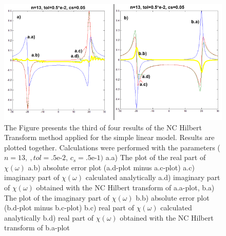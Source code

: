 \documentclass[12pt,twoside,a4paper]{article}
\numberwithin{equation}{subsection}
\numberwithin{figure}{subsection}
\begin{document}
\begin{figure}
  \includegraphics[width=150mm]{img/nc_lin3.png}
  \caption{ The Figure presents the third of four results of the NC Hilbert Transform method applied for the simple linear model. Results are plotted together. Calculations were performed with the parameters ($n = 13, \ , tol = \mbox{.5e-2}, \, c_s = \mbox{.5e-1})$
    a.a) The plot of the real part of $\chi (\omega )$
    a.b) absolute error plot (a.d-plot minus a.c-plot) 
    a.c) imaginary part of $\chi (\omega )$ calculated analytically 
    a.d) imaginary part of $\chi (\omega )$ obtained with the NC Hilbert transform of a.a-plot, 
    b.a) The plot of the imaginary part of $\chi (\omega )$
    b.b) absolute error plot (b.d-plot minus b.c-plot) 
    b.c) real part of $\chi (\omega )$ calculated analytically 
    b.d) real part of $\chi (\omega )$ obtained with the NC Hilbert transform of b.a-plot
    \label{fig:nc_lin3}     
  }
\end{figure}
\end{document}
